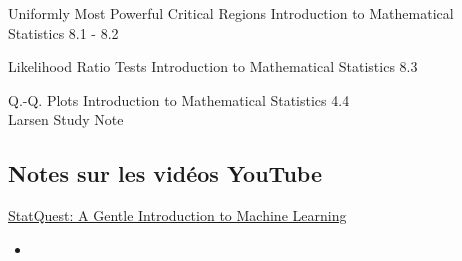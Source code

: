 \begin{CHPT_SUMM_AUTO_NUMB}[label = {L.-39}]{Uniformly Most Powerful Critical Regions}
Introduction to Mathematical Statistics 8.1 - 8.2

\tcbline


\end{CHPT_SUMM_AUTO_NUMB}

\begin{CHPT_SUMM_AUTO_NUMB}[label = {L.-40}]{Likelihood Ratio Tests}
Introduction to Mathematical Statistics 8.3

\tcbline


\end{CHPT_SUMM_AUTO_NUMB}

\begin{CHPT_SUMM_AUTO_NUMB}[label = {L.-41}]{Q.-Q. Plots}
Introduction to Mathematical Statistics 4.4	\\
Larsen Study Note

\tcbline


\end{CHPT_SUMM_AUTO_NUMB}

\subsection{Notes sur les vidéos YouTube}

\begin{YTB_SUMM}[label = {SQ-BASICS-ML-INTRO}]{\href{https://www.youtube.com/watch?v=Gv9_4yMHFhI&list=PLblh5JKOoLUICTaGLRoHQDuF_7q2GfuJF&index=2&t=0s}{StatQuest: A Gentle Introduction to Machine Learning}}
\begin{itemize}
	\item	
\end{itemize}
\end{YTB_SUMM}
